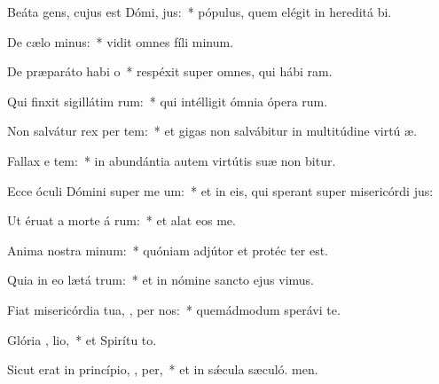 \item Beáta gens, cujus est Dómi,  jus:~* pópulus, quem elégit in hereditá bi.
\item De cælo  minus:~* vidit omnes fíli minum.
\item De præparáto habi o~* respéxit super omnes, qui hábi ram.
\item Qui finxit sigillátim  rum:~* qui intélligit ómnia ópera rum.
\item Non salvátur rex per  tem:~* et gigas non salvábitur in multitúdine virtú æ.
\item Fallax e  tem:~* in abundántia autem virtútis suæ non bitur.
\item Ecce óculi Dómini super me um:~* et in eis, qui sperant super misericórdi jus:
\item Ut éruat a morte á rum:~* et alat eos  me.
\item Anima nostra  minum:~* quóniam adjútor et protéc ter est.
\item Quia in eo lætá  trum:~* et in nómine sancto ejus vimus.
\item Fiat misericórdia tua, , per nos:~* quemádmodum sperávi  te.
\item Glória ,  lio,~* et Spirítu to.
\item Sicut erat in princípio,  ,  per,~* et in sǽcula sæculó. men.
